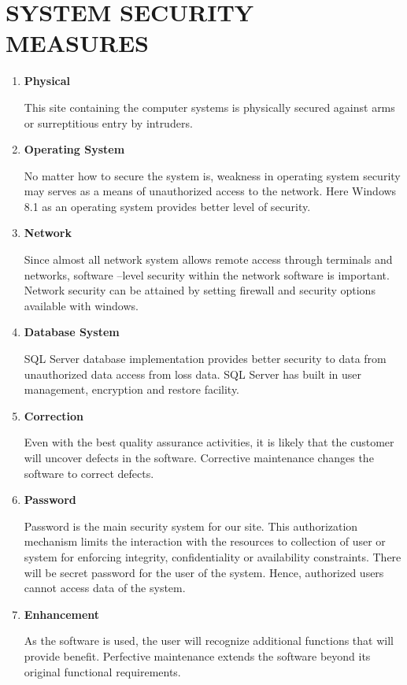 \chapter{SYSTEM SECURITY MEASURES}
\begin{enumerate}
\item {\bf Physical }

This site containing the computer systems is physically secured against arms or surreptitious entry by intruders. 

\item {\bf Operating System }

No matter how to secure the system is, weakness in operating system security may serves as a means of unauthorized access to the network. Here Windows 8.1 as an operating system provides better level of security.  

\item {\bf Network }

Since almost all network system allows remote access through terminals and networks, software –level security within the network software is important. Network security can be attained by setting firewall and security options available with windows.  

\item {\bf Database System }

           SQL Server database implementation provides better security to data from unauthorized data access from loss data. SQL Server has built in user management, encryption and restore facility. 


\item {\bf Correction}

Even with the best quality assurance activities, it is likely that the customer will uncover defects in the software. Corrective maintenance changes the software to correct defects. 

\item {\bf Password }

 Password is the main security system for our site. This authorization mechanism limits the interaction with the resources to collection of user or system for enforcing integrity, confidentiality or availability constraints. There will be secret password for the user of the system. Hence, authorized users cannot access data of the system.

\item {\bf Enhancement}

As the software is used, the user will recognize additional functions that will provide benefit. Perfective maintenance extends the software beyond its original functional requirements.



\end{enumerate}
